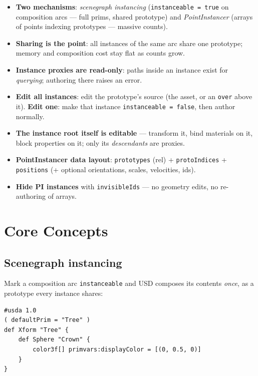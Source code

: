 \CheatSheetTitle
\begin{itemize}[leftmargin=*]
  \item \textbf{Two mechanisms}: \emph{scenegraph instancing}
        (\texttt{instanceable = true} on composition arcs --- full prims,
        shared prototype) and \emph{PointInstancer} (arrays of points
        indexing prototypes --- massive counts).
  \item \textbf{Sharing is the point}: all instances of the same arc share
        one prototype; memory and composition cost stay flat as counts grow.
  \item \textbf{Instance proxies are read-only}: paths inside an instance
        exist for \emph{querying}; authoring there raises an
        error.
  \item \textbf{Edit all instances}: edit the prototype's source (the asset,
        or an \texttt{over} above it). \textbf{Edit one}: make that instance
        \texttt{instanceable = false}, then author normally.
  \item \textbf{The instance root itself is editable} --- transform it, bind
        materials on it, block properties on it; only its \emph{descendants}
        are proxies.
  \item \textbf{PointInstancer data layout}: \texttt{prototypes} (rel) +
        \texttt{protoIndices} + \texttt{positions} (+ optional orientations,
        scales, velocities, ids).
  \item \textbf{Hide PI instances} with \texttt{invisibleIds} --- no geometry
        edits, no re-authoring of arrays.
\end{itemize}

\section{Core Concepts}

\subsection{Scenegraph instancing}\label{sec:ca-sg}
Mark a composition arc \texttt{instanceable} and USD composes its contents
\emph{once}, as a prototype every instance shares:

\begin{lstlisting}
#usda 1.0
( defaultPrim = "Tree" )
def Xform "Tree" {
    def Sphere "Crown" {
        color3f[] primvars:displayColor = [(0, 0.5, 0)]
    }
}
\end{lstlisting}

